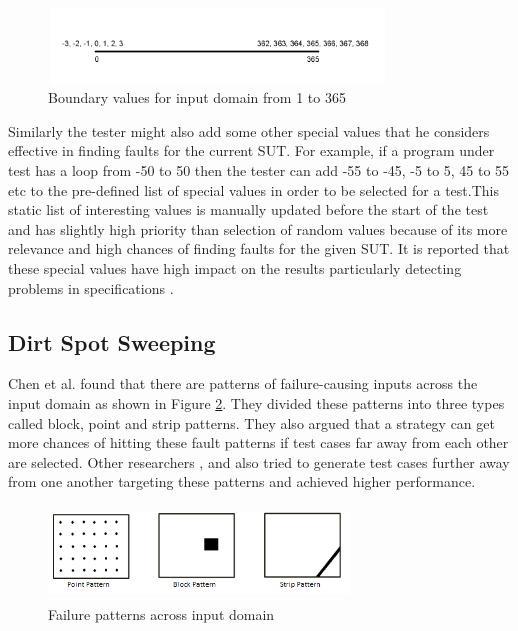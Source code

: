 \documentclass[conference]{IEEEtran}
\begin{document}
\begin{figure}[ht]
\centering
\includegraphics[width= 9cm,height=2cm]{boundary.png}
\caption{Boundary values for input domain from 1 to 365}
\label{fig:boundaryValues}
\end{figure}

Similarly the tester might also add some other special values that he considers effective in finding faults for the current SUT. For example, if a program under test has a loop from -50 to 50 then the tester can add -55 to -45, -5 to 5, 45 to 55 etc to the pre-defined list of special values in order to be selected for a test.This static list of interesting values is manually updated before the start of the test and has slightly high priority than selection of random values because of its more relevance and high chances of finding faults for the given SUT. It is reported that these special values have high impact on the results particularly detecting problems in specifications \cite{Ciupa2008}.

\subsection{Dirt Spot Sweeping}
Chen et al. \cite{Chen2008} found that there are patterns of failure-causing inputs across the input domain as shown in Figure \ref{fig:patterns}. They divided these patterns into three types called block, point and strip patterns. They also argued that a strategy can get more chances of hitting these fault patterns if test cases far away from each other are selected. Other researchers \cite{Chan2002}, \cite{Chen2003} and \cite{Chen2005} also tried to generate test cases further away from one another targeting these patterns and achieved higher performance.\\
\begin{figure}[ht]                                    
\centering
\includegraphics[width= 8cm,height=2.5cm]{ART_Patterns.png}
\caption{Failure patterns across input domain \cite{Chen2008}}
\label{fig:patterns}
\end{figure}
\end{document}
